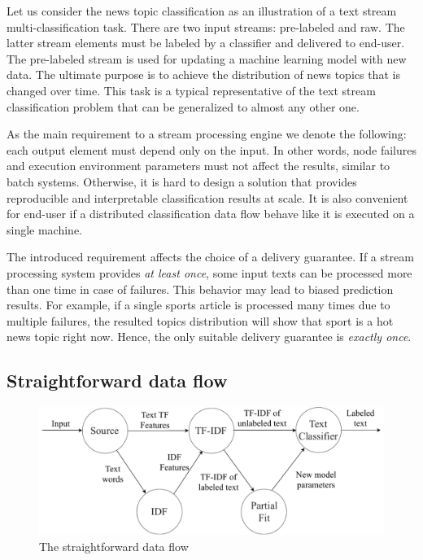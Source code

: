 \label{fs-framework}

Let us consider the news topic classification as an illustration of a text stream multi-classification task. There are two input streams: pre-labeled and raw. The latter stream elements must be labeled by a classifier and delivered to end-user. The pre-labeled stream is used for updating a machine learning model with new data. The ultimate purpose is to achieve the distribution of news topics that is changed over time. This task is a typical representative of the text stream classification problem that can be generalized to almost any other one.

As the main requirement to a stream processing engine we denote the following: each output element must depend only on the input. In other words, node failures and execution environment parameters must not affect the results, similar to batch systems. Otherwise, it is hard to design a solution that provides reproducible and interpretable classification results at scale. It is also convenient for end-user if a distributed classification data flow behave like it is executed on a single machine.

The introduced requirement affects the choice of a delivery guarantee. If a stream processing system provides {\em at least once}, some input texts can be processed more than one time in case of failures. This behavior may lead to biased prediction results. For example, if a single sports article is processed many times due to multiple failures, the resulted topics distribution will show that sport is a hot news topic right now. Hence, the only suitable delivery guarantee is {\em exactly once}.

\subsection{Straightforward data flow}

\begin{figure}[htbp]
  \centering
  \includegraphics[scale=0.48]{pics/logical-graph}
  \caption{The straightforward data flow}
  \label {logical_graph}
\end{figure}

